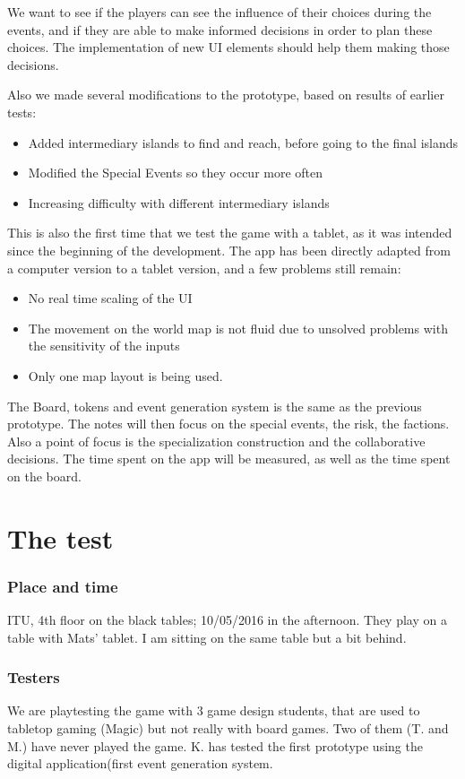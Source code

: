 \documentclass[a4paper,11pt]{report}
\begin{document}
We want to see if the players can see the influence of their choices during the events, and if they are able to make informed decisions in order to plan these choices. The implementation of new UI elements should help them making those decisions.

Also we made several modifications to the prototype, based on results of earlier tests:
\begin{itemize}
\item Added intermediary islands to find and reach, before going to the final islands
\item Modified the Special Events so they occur more often
\item Increasing difficulty with different intermediary islands
\end{itemize}

This is also the first time that we test the game with a tablet, as it was intended since the beginning of the development. The app has been directly adapted from a computer version to a tablet version, and a few problems still remain:
\begin{itemize}
\item No real time scaling of the UI
\item The movement on the world map is not fluid due to unsolved problems with the sensitivity of the inputs
\item Only one map layout is being used.
\end{itemize}

The Board, tokens and event generation system is the same as the previous prototype. The notes will then focus on the special events, the risk, the factions. Also a point of focus is the specialization construction and the collaborative decisions. The time spent on the app will be measured, as well as the time spent on the board.

\section{The test}

\subsubsection{Place and time}
ITU, 4th floor on the black tables; 10/05/2016 in the afternoon. They play on a table with Mats'  tablet. I am sitting on the same table but a bit behind.

\subsubsection{Testers}
We are playtesting the game with 3 game design students, that are used to tabletop gaming (Magic) but not really with board games. Two of them (T. and M.) have never played  the game. K. has tested the first prototype using the digital application(first event generation system.
\end{document}
